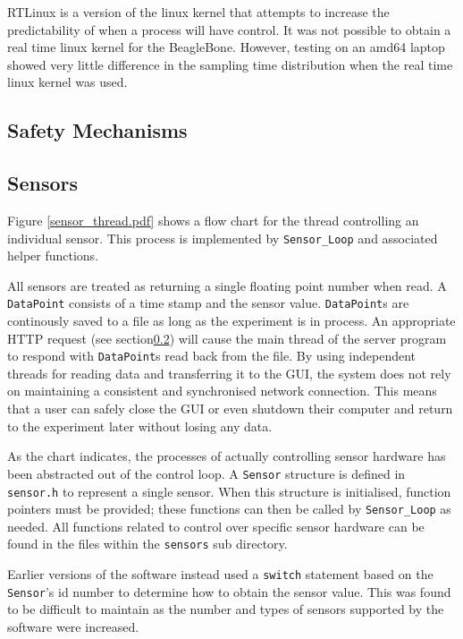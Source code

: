RTLinux is a version of the linux kernel that attempts to increase the predictability of when a process will have control\cite{rtlinux}. It was not possible to obtain a real time linux kernel for the BeagleBone. However, testing on an amd64 laptop showed very little difference in the sampling time distribution when the real time linux kernel was used.



\subsection{Safety Mechanisms}



\subsection{Sensors}

Figure \ref{sensor_thread.pdf} shows a flow chart for the thread controlling an individual sensor. This process is implemented by \verb/Sensor_Loop/ and associated helper functions.

All sensors are treated as returning a single floating point number when read. A \verb/DataPoint/ consists of a time stamp and the sensor value. \verb/DataPoint/s are continously saved to a file as long as the experiment is in process. An appropriate HTTP request (see section\ref{}) will cause the main thread of the server program to respond with \verb/DataPoint/s read back from the file. By using independent threads for reading data and transferring it to the GUI, the system does not rely on maintaining a consistent and synchronised network connection. This means that a user can safely close the GUI or even shutdown their computer and return to the experiment later without losing any data.



As the chart indicates, the processes of actually controlling sensor hardware has been abstracted out of the control loop. A \verb/Sensor/ structure is defined in \verb/sensor.h/ to represent a single sensor. When this structure is initialised, function pointers must be provided; these functions can then be called by \verb/Sensor_Loop/ as needed. All functions related to control over specific sensor hardware can be found in the files within the \verb/sensors/ sub directory.

Earlier versions of the software instead used a \verb/switch/ statement based on the \verb/Sensor/'s id number to determine how to obtain the sensor value. This was found to be difficult to maintain as the number and types of sensors supported by the software were increased.



